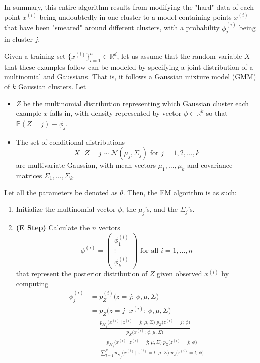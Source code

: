   In summary, this entire algorithm results from modifying the "hard" data of each point $x^{(i)}$ being undoubtedly in one cluster to a model containing points $x^{(i)}$ that have been "smeared" around different clusters, with a probability $\phi_j^{(i)}$ being in cluster $j$. 

  \begin{definition}
    Given a training set $\{x^{(i)}\}_{i=1}^n \in \mathbb{R}^d$, let us assume that the random variable $X$ that these examples follow can be modeled by specifying a joint distribution of a multinomial and Gaussians. 
    That is, it follows a Gaussian mixture model (GMM) of $k$ Gaussian clusters. Let
    \begin{itemize}
      \item $Z$ be the multinomial distribution representing which Gaussian cluster each example $x$ falls in, with density represented by vector $\phi \in \mathbb{R}^k$ so that $\mathbb{P}(Z = j) \equiv \phi_j$.
      \item The set of conditional distributions 
      \begin{equation}
        X\,|\,Z = j \sim \mathcal{N}(\mu_j, \Sigma_j) \text{ for } j = 1, 2, \ldots, k
      \end{equation}
      are multivariate Gaussian, with mean vectors $\mu_1, \ldots, \mu_k$ and covariance matrices $\Sigma_1, \ldots, \Sigma_k$. 
    \end{itemize}
    Let all the parameters be denoted as $\theta$. Then, the EM algorithm is as such: 
    \begin{enumerate}
      \item Initialize the multinomial vector $\phi$, the $\mu_j$'s, and the $\Sigma_j$'s.

      \item \textbf{(E Step)} Calculate the $n$ vectors
      \begin{equation}
        \phi^{(i)} = \begin{pmatrix} \phi_1^{(i)} \\ \vdots \\ \phi_k^{(i)} \end{pmatrix} \text{ for all } i = 1, \ldots, n
      \end{equation}
      that represent the posterior distribution of $Z$ given observed $x^{(i)}$ by computing 
      \begin{align*} 
        \phi_j^{(i)} & = p_Z^{(i)} \big(z = j;\, \phi, \mu, \Sigma \big) \\
        & = p_Z \big(z = j\,|\, x^{(i)}; \, \phi, \mu, \Sigma \big) \\
        & = \frac{p_{\mathcal{N}_j} \big(x^{(i)}\,|\,z^{(i)} = j; \, \mu, \Sigma\big) \; p_Z \big(z^{(i)} = j;\, \phi \big)}{p_X \big(x^{(i)};\, \phi, \mu, \Sigma\big)} \\
        & = \frac{p_{\mathcal{N}_j} \big(x^{(i)}\,|\,z^{(i)} = j; \, \mu, \Sigma\big) \; p_Z \big(z^{(i)} = j;\, \phi \big)}{\sum_{l=1}^k p_{\mathcal{N}_j} \big( x^{(i)}\,|\, z^{(i)} = l;\, \mu, \Sigma \big)\; p_Z \big(z^{(i)} = l; \,\phi\big)}
      \end{align*}


\end{enumerate}
\end{definition}
